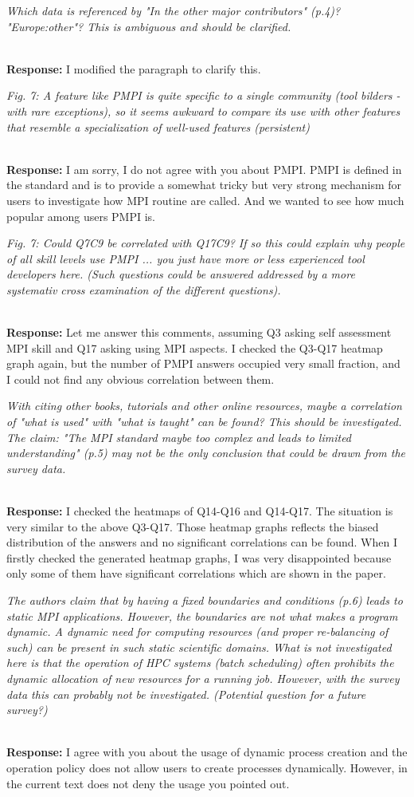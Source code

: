 \documentclass[11pt]{article}
\newcommand{\iresponse}[2]{{\item \em #1}\\%
  {\bf Response:} #2}
\begin{document}
\begin{enumerate}
\iresponse{Which data is referenced by "In the other major
  contributors" (p.4)? "Europe:other"? This is ambiguous and should be
  clarified.}
{I modified the paragraph to clarify this.}

\iresponse{Fig. 7: A feature like PMPI is quite specific to a single
  community (tool bilders - with rare exceptions), so it seems awkward
  to compare its use with other features that resemble a
  specialization of well-used features (persistent)}
{I am sorry, I do not agree with you about PMPI. PMPI is defined in the
standard and is to provide a somewhat tricky but very strong mechanism
for users to investigate how MPI routine are called. And we wanted to
see how much popular among users PMPI is.}

\iresponse{Fig. 7: Could Q7C9 be correlated with Q17C9? If so this
  could explain why people of all skill levels use PMPI ... you just
  have more or less experienced tool developers here. (Such questions
  could be answered addressed by a more systemativ cross examination
  of the different questions).}
{Let me answer this comments, assuming Q3 asking self assessment MPI
  skill and Q17 asking using MPI aspects. I checked the Q3-Q17 heatmap
graph again, but the number of PMPI answers occupied very small
fraction, and I could not find any obvious correlation between them.}

\iresponse{With citing other books, tutorials and other online
  resources, maybe a correlation of "what is used" with "what is
  taught" can be found? This should be investigated. The claim: "The
  MPI standard maybe too complex and leads to limited understanding"
  (p.5) may not be the only conclusion that could be drawn from the
  survey data.}
{I checked the heatmaps of Q14-Q16 and Q14-Q17. The situation is very
  similar to the above Q3-Q17. Those heatmap graphs reflects the
  biased distribution of the answers and no significant correlations
  can be found. When I firstly checked the generated heatmap graphs, I
  was very disappointed because only some of them have significant
  correlations which are shown in the paper.}

\iresponse{The authors claim that by having a fixed boundaries and
  conditions (p.6) leads to static MPI applications. However, the
  boundaries are not what makes a program dynamic. A dynamic need for
  computing resources (and proper re-balancing of such) can be present
  in such static scientific domains. What is not investigated here is
  that the operation of HPC systems (batch scheduling) often prohibits
  the dynamic allocation of new resources for a running job. However,
  with the survey data this can probably not be
  investigated. (Potential question for a future survey?)} 
{I agree with you about the usage of dynamic process creation and the
  operation policy does not allow users to create processes dynamically.
  However, in the current text does not deny the usage you pointed
  out.}


\end{enumerate}
\end{document}
